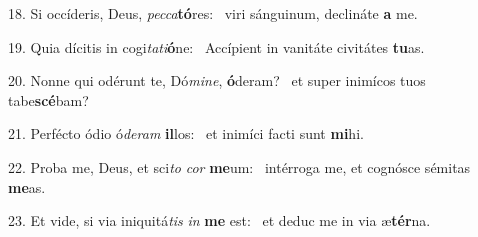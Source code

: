 18. Si occíderis, Deus, \textit{pec}\textit{ca}\textbf{tó}res: \ast\  viri sánguinum, declináte \textbf{a} me.\

19. Quia dícitis in cogi\textit{ta}\textit{ti}\textbf{ó}ne: \ast\  Accípient in vanitáte civitátes \textbf{tu}as.\

20. Nonne qui odérunt te, Dó\textit{mi}\textit{ne}, \textbf{ó}deram? \ast\  et super inimícos tuos tabe\textbf{scé}bam?\

21. Perfécto ódio ó\textit{de}\textit{ram} \textbf{il}los: \ast\  et inimíci facti sunt \textbf{mi}hi.\

22. Proba me, Deus, et sci\textit{to} \textit{cor} \textbf{me}um: \ast\  intérroga me, et cognósce sémitas \textbf{me}as.\

23. Et vide, si via iniquitá\textit{tis} \textit{in} \textbf{me} est: \ast\  et deduc me in via æ\textbf{tér}na.\


